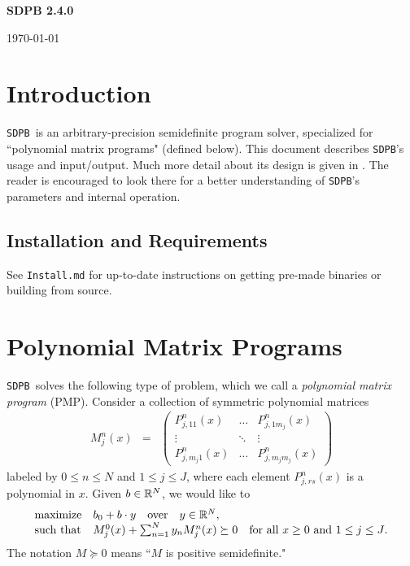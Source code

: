 \documentclass[12pt]{article}
\numberwithin{equation}{section}
\renewcommand{\be}{\begin{eqnarray}}
\renewcommand{\ee}{\end{eqnarray}}
\newcommand\SDPB{\texttt{SDPB}}
\begin{document}
{\Large
\begin{center}
{\bf SDPB 2.4.0 \\\vspace{.1in}}
\end{center}
}
\begin{center}
\noindent \today
\end{center}
\tableofcontents

\section{Introduction}

\SDPB\ is an arbitrary-precision semidefinite program solver, specialized for ``polynomial matrix programs" (defined below).  This document describes \SDPB's usage and input/output.  Much more detail about its design is given in \cite{DSD}. The reader is encouraged to look there for a better understanding of \SDPB's parameters and internal operation.

\subsection{Installation and Requirements}

See \texttt{Install.md} for up-to-date instructions on getting
pre-made binaries or building from source.

\section{Polynomial Matrix Programs}
\label{sec:PMP}

\SDPB\ solves the following type of problem, which we call a {\it polynomial matrix program} (PMP).  Consider a collection of symmetric polynomial matrices
\be
M_j^n(x) &=& \begin{pmatrix}
P_{j,11}^{n}(x) & \dots & P_{j,1m_j}^{n}(x)\\
\vdots & \ddots & \vdots\\
P_{j,m_j1}^{n}(x) & \dots & P^{n}_{j,m_jm_j}(x)
\end{pmatrix}
\ee
labeled by $0 \leq n \leq N$ and $1 \leq j \leq J$,
where each element $P_{j,rs}^{n}(x)$ is a polynomial in $x$.  
Given $b\in \mathbb{R}^N$, we would like to
\be
\label{eq:PMPconstraint}
\begin{array}{ll}
\textrm{maximize} & b_0+b\.y\quad\textrm{over}\quad y \in \R^N,\\
\textrm{such that} & M^0_j(x)+\sum_{n=1}^{N} y_n M^n_j(x) \succeq 0 \quad \textrm{for all $x\geq 0$ and $1 \leq j \leq J$}.
\end{array}
\ee
The notation $M\succeq 0$ means ``$M$ is positive semidefinite."
\end{document}
